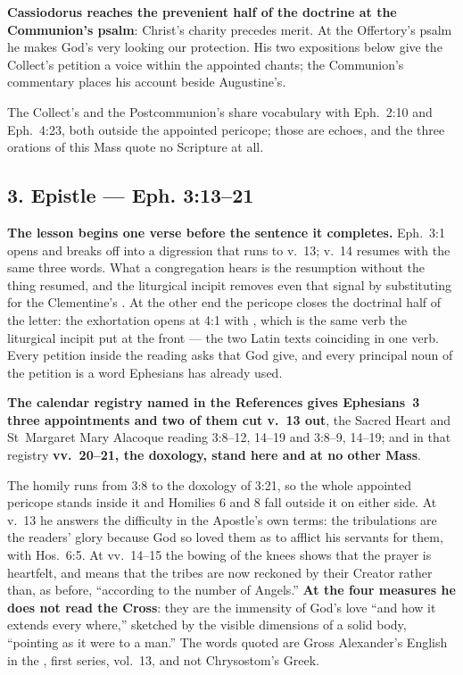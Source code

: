 \textbf{Cassiodorus reaches the prevenient half of the doctrine at the
Communion's psalm}: Christ's charity precedes merit. At the Offertory's psalm
he makes God's very looking our protection. His two expositions below give the
Collect's petition a voice within the appointed chants; the Communion's
commentary places his account beside Augustine's.

The Collect's  and the Postcommunion's  share vocabulary with Eph.~2:10 and Eph.~4:23, both
outside the appointed pericope; those are echoes, and the three orations of this
Mass quote no Scripture at all.

\subsection*{3. Epistle  --- Eph. 3:13--21}

\textbf{The lesson begins one verse before the sentence it completes.} Eph.~3:1
opens  and breaks off into a digression that runs to
v.~13; v.~14 resumes with the same three words. What a congregation hears is the
resumption without the thing resumed, and the liturgical incipit removes even
that signal by substituting  for the Clementine's
. At the other end the pericope closes the doctrinal
half of the letter: the exhortation opens at 4:1 with , which is the same verb the liturgical incipit put at the front --- the
two Latin texts coinciding in one verb. Every petition inside
the reading asks that God give, and every principal noun of the petition is a
word Ephesians has already used.

\textbf{The calendar registry named in the References gives Ephesians~3 three
appointments and two of them cut v.~13 out}, the Sacred Heart and St~Margaret
Mary Alacoque reading 3:8--12, 14--19 and 3:8--9, 14--19; and in that registry
\textbf{vv.~20--21, the doxology, stand here and at no other Mass}.

\begin{witnessnote}
 The homily runs from 3:8
to the doxology of 3:21, so the whole appointed pericope stands inside it and
Homilies 6 and 8 fall outside it on either side. At v.~13 he answers the
difficulty in the Apostle's own terms: the tribulations are the readers'
glory because God so loved them as to afflict his servants for them, with
Hos.~6:5. At vv.~14--15 the bowing of the knees shows that the prayer is
heartfelt, and  means that the tribes are now reckoned
by their Creator rather than, as before, ``according to the number of Angels.''
\textbf{At the four measures he does not read the Cross}: they are the immensity
of God's love ``and how it extends every where,'' sketched by the visible
dimensions of a solid body, ``pointing as it were to a man.'' The words quoted
are Gross Alexander's English in the ,
first series, vol.~13, and not Chrysostom's Greek.
\end{witnessnote}


